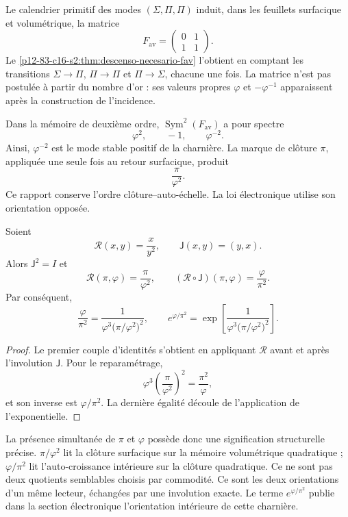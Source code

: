 Le calendrier primitif des modes
\((\Sigma,\Pi,\Pi)\) induit, dans les feuillets surfacique et volumétrique, la matrice
\[
 F_{\mathrm{av}}
 =
 \begin{pmatrix}
 0&1\\
 1&1
 \end{pmatrix}.
\]
Le \cref{p12-83-c16-s2:thm:descenso-necesario-fav} l'obtient en comptant les transitions
\(\Sigma\to\Pi\), \(\Pi\to\Pi\) et \(\Pi\to\Sigma\), chacune une fois.
La matrice n'est pas postulée à partir du nombre d'or : ses valeurs propres
\(\varphi\) et \(-\varphi^{-1}\) apparaissent après la construction de
l'incidence.

Dans la mémoire de deuxième ordre,
\(\operatorname{Sym}^2(F_{\mathrm{av}})\) a pour spectre
\[
 \varphi^2,\qquad -1,\qquad\varphi^{-2}.
\]
Ainsi, \(\varphi^{-2}\) est le mode stable positif de la charnière. La marque
de clôture \(\pi\), appliquée une seule fois au retour surfacique, produit
\[
 \frac{\pi}{\varphi^2}.
\]
Ce rapport conserve l'ordre clôture--auto-échelle. La loi électronique utilise son
orientation opposée.

\begin{theorem}
\label{p12-83-c15-s2:thm:espejo-electron-rev6}
Soient
\[
 \mathscr R(x,y)=\frac{x}{y^2},
 \qquad
 \mathsf J(x,y)=(y,x).
\]
Alors \(\mathsf J^2=I\) et
\[
 \mathscr R(\pi,\varphi)=\frac{\pi}{\varphi^2},
 \qquad
 (\mathscr R\circ\mathsf J)(\pi,\varphi)
 =\frac{\varphi}{\pi^2}.
\]
Par conséquent,
\[
 \frac{\varphi}{\pi^2}
 =
 \frac{1}{
 \varphi^3\bigl(\pi/\varphi^2\bigr)^2},
 \qquad
 e^{\varphi/\pi^2}
 =
 \exp\!\left[
 \frac{1}{
 \varphi^3\bigl(\pi/\varphi^2\bigr)^2}
 \right].
\]
\end{theorem}

\begin{proof}
Le premier couple d'identités s'obtient en appliquant
\(\mathscr R\) avant et après l'involution \(\mathsf J\). Pour le
reparamétrage,
\[
 \varphi^3
 \left(\frac{\pi}{\varphi^2}\right)^2
 =\frac{\pi^2}{\varphi},
\]
et son inverse est \(\varphi/\pi^2\). La dernière égalité découle de l'application de
l'exponentielle.
\end{proof}

La présence simultanée de \(\pi\) et \(\varphi\) possède donc une
signification structurelle précise. \(\pi/\varphi^2\) lit la clôture surfacique
sur la mémoire volumétrique quadratique ; \(\varphi/\pi^2\) lit
l'auto-croissance intérieure sur la clôture quadratique. Ce ne sont pas deux quotients
semblables choisis par commodité. Ce sont les deux orientations d'un même
lecteur, échangées par une involution exacte. Le terme
\(e^{\varphi/\pi^2}\) publie dans la section électronique l'orientation
intérieure de cette charnière.

